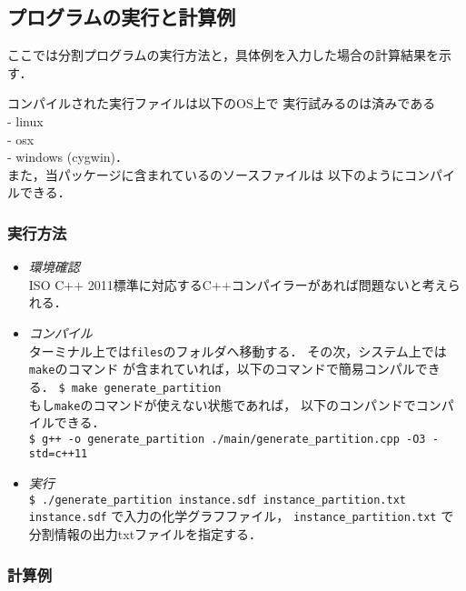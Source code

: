 \documentclass[11pt,titlepage,dvipdfmx,twoside]{jarticle}
\begin{document}

\subsection{プログラムの実行と計算例}
\label{sec:Example_p}

ここでは分割プログラムの実行方法と，具体例を入力した場合の計算結果を示す．

コンパイルされた実行ファイルは以下のOS上で
実行試みるのは済みである\\
- linux \\
- osx \\
- windows (cygwin)．\\
また，当パッケージに含まれているのソースファイルは
以下のようにコンパイルできる．

\subsubsection{実行方法}
\label{sec:compile_p}
\begin{itemize}
	\item {\em 環境確認}\\
		ISO C++ 2011標準に対応するC++コンパイラーがあれば問題ないと考えられる．
	\item {\em コンパイル}\\
	      ターミナル上では{\tt files}のフォルダへ移動する．
	      その次，システム上では{\tt make}のコマンド
	      が含まれていれば，以下のコマンドで簡易コンパルできる．
	      \verb|$ make generate_partition|\\
	      もし{\tt make}のコマンドが使えない状態であれば，
	      以下のコンパンドでコンパイルできる． \\	
		\verb|$ g++ -o generate_partition ./main/generate_partition.cpp -O3 -std=c++11|
	\item {\em 実行}\\
		\verb|$ ./generate_partition instance.sdf instance_partition.txt|\\
		\verb|instance.sdf| で入力の化学グラフファイル，
	  \verb|instance_partition.txt| で分割情報の出力txtファイルを指定する．
\end{itemize}


\subsubsection{計算例}
\label{sec:instance_p}
\end{document}
